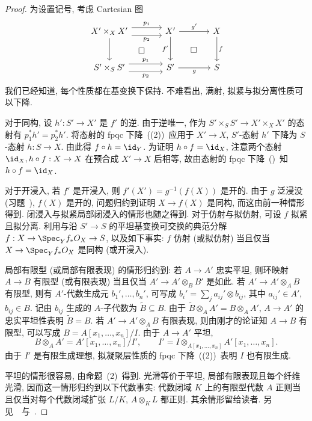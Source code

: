 \begin{proof}
为设置记号, 考虑 Cartesian 图
\[
\begin{tikzcd}[column sep=large,row sep=large]
X'\times_X X'\arrow[d]\arrow[dr,phantom,"\square"]\arrow[r,shift left=1.1ex,"p_1"]
\arrow[r,shift right=1.1ex,"p_2"']&
X'\arrow[d,"f'"']\arrow[r,"g'"]\arrow[dr,phantom,"\square"]&
X\arrow[d,"f"]\\
S'\times_S S'\arrow[r,shift left=1.1ex,"p_1"]
\arrow[r,shift right=1.1ex,"p_2"']&S'\arrow[r,"g"']&S
\end{tikzcd}
\]
我们已经知道, 每个性质都在基变换下保持. 不难看出, 满射, 拟紧与拟分离性质可以下降.

对于同构, 设 $h':S'\to X'$ 是 $f'$ 的逆. 由于逆唯一, 作为 $S'\times_S S'\to X'\times_X X'$ 的态射有 $p_1^*h'=p_2^*h'$. 将态射的 fpqc 下降~((2))~应用于 $X'\to X$, $S'$-态射 $h'$ 下降为 $S$-态射 $h:S\to X$. 由此得 $f\circ h=\id_Y$. 为证明 $h\circ f=\id_X$, 注意两个态射 $\id_X,h\circ f:X\to X$ 在预合成 $X'\to X$ 后相等, 故由态射的 fpqc 下降~()~知 $h\circ f=\id_X$.

对于开浸入, 若 $f'$ 是开浸入, 则 $f'(X')=g^{-1}(f(X))$ 是开的. 由于 $g$ 泛浸没 (习题~), $f(X)$ 是开的, 问题归约到证明 $X\to f(X)$ 是同构, 而这由前一种情形得到. 闭浸入与拟紧局部闭浸入的情形也随之得到.
对于仿射与拟仿射, 可设 $f$ 拟紧且拟分离. 利用与沿 $S'\to S$ 的平坦基变换可交换的典范分解 $f:X\to\Spec_Y f_*\mathcal O_X\to S$, 以及如下事实: $f$ 仿射 (或拟仿射) 当且仅当 $X\to\Spec_Y f_*\mathcal O_X$ 是同构 (或开浸入).

局部有限型 (或局部有限表现) 的情形归约到: 若 $A\to A'$ 忠实平坦, 则环映射 $A\to B$ 有限型 (或有限表现) 当且仅当 $A'\to A'\otimes_B B'$ 是如此.
若 $A'\to A'\otimes_A B$ 有限型, 则有 $A'$-代数生成元 $b_1',\ldots,b_n'$, 可写成 $b_i'=\sum_j a_{ij}'\otimes b_{ij}$, 其中 $a_{ij}'\in A'$, $b_{ij}\in B$. 记由 $b_{ij}$ 生成的 $A$-子代数为 $\widetilde B\subseteq B$. 由于 $\widetilde B\otimes_A A'=B\otimes_A A'$, $A\to A'$ 的忠实平坦性表明 $\widetilde B=B$.
若 $A'\to A'\otimes_A B$ 有限表现, 则由刚才的论证知 $A\to B$ 有限型, 可以写成 $B=A[x_1,\ldots,x_n]/I$. 由于 $A\to A'$ 平坦,
\[
B\otimes_A A'=A'[x_1,\ldots,x_n]/I',
\qquad
I'=I\otimes_{A[x_1,\ldots,x_n]}A'[x_1,\ldots,x_n].
\]
由于 $I'$ 是有限生成理想, 拟凝聚层性质的 fpqc 下降~((2))~表明 $I$ 也有限生成.

平坦的情形很容易, 由命题~(2)~得到. 光滑等价于平坦, 局部有限表现且每个纤维光滑, 因而这一情形归约到以下代数事实: 代数闭域 $K$ 上的有限型代数 $A$ 正则当且仅当对每个代数闭域扩张 $L/K$, $A\otimes_K L$ 都正则. 其余情形留给读者. 另见~\cite[IV2.2.6--7 及 IV4.17.7.4]{EGA}~与~\cite[Tag 02YJ]{SP}.
\end{proof}
